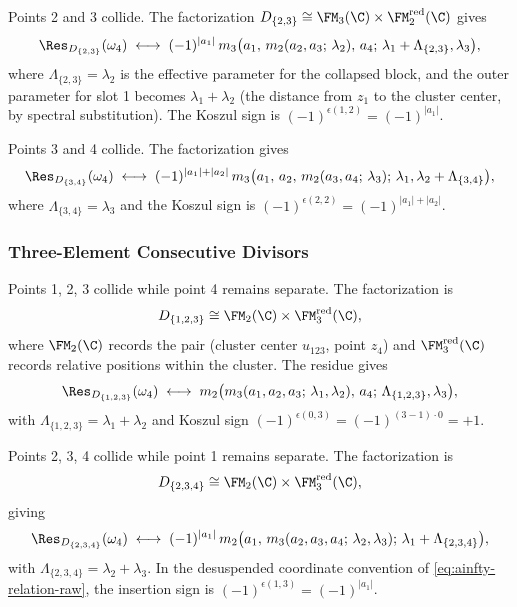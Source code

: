 \begin{computation}[$D_{\{2,3\}}$ in $\FM_4(\C)$]
Points 2 and 3 collide. The factorization
$D_{\{2,3\}} \cong \FM_3(\C) \times \FM_2^{\mathrm{red}}(\C)$ gives
\[
\Res_{D_{\{2,3\}}}(\omega_4) \;\longleftrightarrow\; (-1)^{|a_1|}\, m_3\bigl(a_1,\, m_2(a_2, a_3;\, \lambda_2),\, a_4;\, \lambda_1 + \Lambda_{\{2,3\}}, \lambda_3\bigr),
\]
where $\Lambda_{\{2,3\}} = \lambda_2$ is the effective parameter for the collapsed block, and the outer parameter for slot 1 becomes $\lambda_1 + \lambda_2$ (the distance from $z_1$ to the cluster center, by spectral substitution). The Koszul sign is $(-1)^{\epsilon(1,2)} = (-1)^{|a_1|}$.
\end{computation}

\begin{computation}[$D_{\{3,4\}}$ in $\FM_4(\C)$]
Points 3 and 4 collide. The factorization gives
\[
\Res_{D_{\{3,4\}}}(\omega_4) \;\longleftrightarrow\; (-1)^{|a_1|+|a_2|}\, m_3\bigl(a_1,\, a_2,\, m_2(a_3, a_4;\, \lambda_3);\, \lambda_1, \lambda_2 + \Lambda_{\{3,4\}}\bigr),
\]
where $\Lambda_{\{3,4\}} = \lambda_3$ and the Koszul sign is $(-1)^{\epsilon(2,2)} = (-1)^{|a_1|+|a_2|}$.
\end{computation}

\subsubsection{Three-Element Consecutive Divisors}

\begin{computation}[$D_{\{1,2,3\}}$ in $\FM_4(\C)$]
Points 1, 2, 3 collide while point 4 remains separate. The factorization is
\[
D_{\{1,2,3\}} \cong \FM_2(\C) \times \FM_3^{\mathrm{red}}(\C),
\]
where $\FM_2(\C)$ records the pair (cluster center $u_{123}$, point $z_4$) and $\FM_3^{\mathrm{red}}(\C)$ records relative positions within the cluster. The residue gives
\[
\Res_{D_{\{1,2,3\}}}(\omega_4) \;\longleftrightarrow\; m_2\bigl(m_3(a_1, a_2, a_3;\, \lambda_1, \lambda_2),\, a_4;\, \Lambda_{\{1,2,3\}}, \lambda_3\bigr),
\]
with $\Lambda_{\{1,2,3\}} = \lambda_1 + \lambda_2$ and Koszul sign $(-1)^{\epsilon(0,3)} = (-1)^{(3-1)\cdot 0} = +1$.
\end{computation}

\begin{computation}[$D_{\{2,3,4\}}$ in $\FM_4(\C)$]
Points 2, 3, 4 collide while point 1 remains separate. The factorization is
\[
D_{\{2,3,4\}} \cong \FM_2(\C) \times \FM_3^{\mathrm{red}}(\C),
\]
giving
\[
\Res_{D_{\{2,3,4\}}}(\omega_4) \;\longleftrightarrow\; (-1)^{|a_1|}\, m_2\bigl(a_1,\, m_3(a_2, a_3, a_4;\, \lambda_2, \lambda_3);\, \lambda_1 + \Lambda_{\{2,3,4\}}\bigr),
\]
with $\Lambda_{\{2,3,4\}}=\lambda_2+\lambda_3$.  In the
desuspended coordinate convention of
\eqref{eq:ainfty-relation-raw}, the insertion sign is
$(-1)^{\epsilon(1,3)}=(-1)^{|a_1|}$.
\end{computation}

